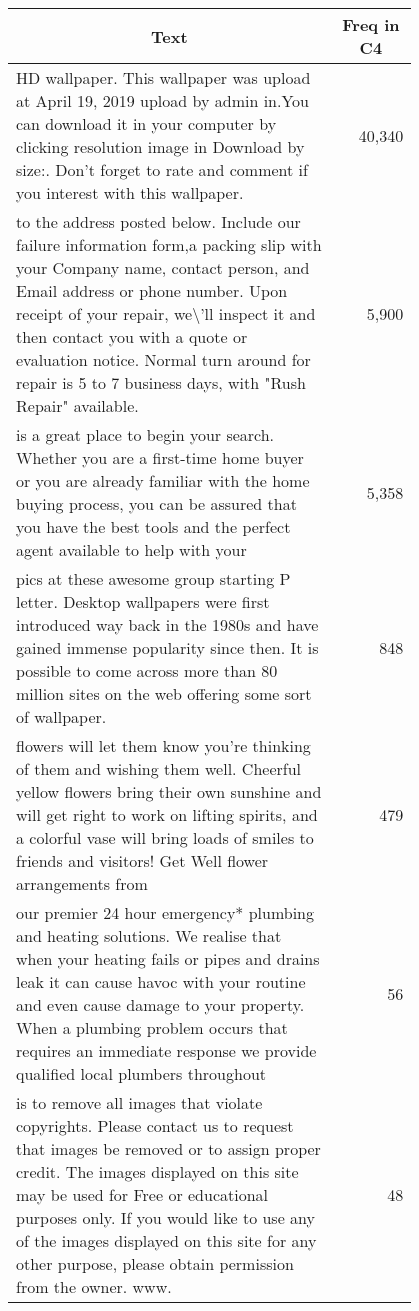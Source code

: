 \begin{table*}[h]
  \centering
  \small
    \begin{tabular}{p{0.8\linewidth}|r}
    \toprule
    \multicolumn{1}{c|}{\textbf{Text}}  & \multicolumn{1}{c}{\textbf{Freq in C4}} \\
    \midrule
    HD wallpaper. This wallpaper was upload at April 19, 2019 upload by admin in.You can download it in your computer by clicking resolution image in Download by size:. Don't forget to rate and comment if you interest with this wallpaper. &            40,340  \\
    \hline
    to the address posted below. Include our failure information form,a packing slip with your Company name, contact person, and Email address or phone number. Upon receipt of your repair, we\textbackslash{}'ll inspect it and then contact you with a quote or evaluation notice. Normal turn aro\newline{}und for repair is 5 to 7 business days, with "Rush Repair" available. &              5,900  \\
    \hline
    is a great place to begin your search. Whether you are a first-time home buyer or you are already familiar with the home buying process, you can be assured that you have the best tools and the perfect agent available to help with your &              5,358  \\
    \hline
    pics at these awesome group starting P letter. Desktop wallpapers were first introduced way back in the 1980s and have gained immense popularity since then. It is possible to come across more than 80 million sites on the web offering some sort of wallpaper. &                 848  \\
    \hline
    flowers will let them know you're thinking of them and wishing them well. Cheerful yellow flowers bring their own sunshine and will get right to work on lifting spirits, and a colorful vase will bring loads of smiles to friends and visitors! Get Well flower arrangements from &                 479  \\
    \hline
    our premier 24 hour emergency* plumbing and heating solutions. We realise that when your heating fails or pipes and drains leak it can cause havoc with your routine and even cause damage to your property. When a plumbing problem occurs that requires an immediate response we provide qualified local plumbers throughout &                   56  \\
    \hline
     is to remove all images that violate copyrights. Please contact us to request that images be removed or to assign proper credit. The images displayed on this site may be used for Free or educational purposes only. If you would like to use any of the images displayed on this site for any other purpose, please obtain permission from the owner. www. &                   48  \\

\end{tabular}
\end{table*}

